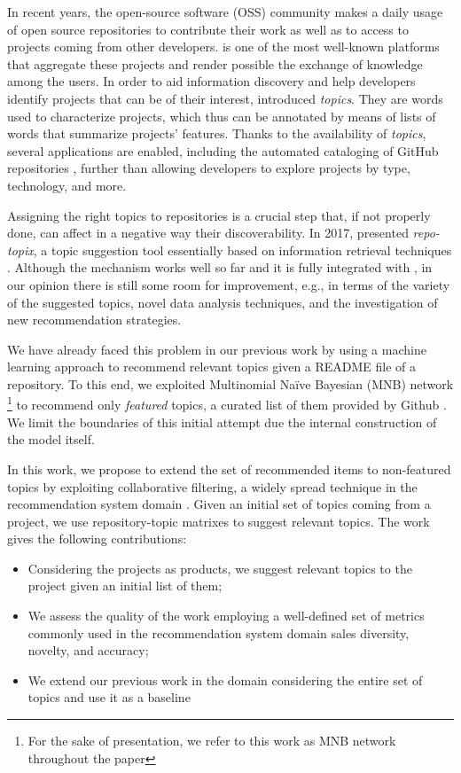 In recent years, the open-source software (OSS) community
makes a daily usage of open source repositories to
contribute their work as well as to access to projects
coming from other developers. \GH is one of the most
well-known platforms that aggregate these projects and
render possible the exchange of knowledge among the users.
%
In order to aid information discovery and help
developers identify projects that can be of their interest, \GH introduced \emph{topics}. They are
words used to characterize projects, which thus can be
annotated by means of lists of words that summarize projects' features. Thanks
to the availability of \emph{topics}, several applications are enabled,
including the automated cataloging of GitHub repositories \cite{davidlo1},
further than allowing developers to explore projects by type, technology, and
more.

Assigning the right topics to \GH repositories is a crucial step that, if not
properly done, can affect in a negative way their discoverability. In
2017, \GH presented \textit{repo-topix}, a topic suggestion tool essentially
based on information retrieval techniques \cite{noauthor_topic_nodate}.
Although the mechanism works well so far and it is fully integrated with \GH, in our opinion there is still some room for improvement, e.g., in terms of the variety
of the suggested topics, novel data analysis techniques, and the investigation of new recommendation strategies.

We have already faced this problem in our previous work \cite{MNB} by using a machine learning approach to recommend relevant topics given a README file of a repository. To this end, we exploited Multinomial Na\"ive Bayesian 
(MNB) network \footnote{For the sake of presentation, we refer to this work as MNB network throughout the paper} to recommend only \emph{featured} topics, a curated list of them provided by Github \cite{}. We limit the boundaries of this initial attempt due the internal construction of the model itself.

In this work, we propose to extend the set of recommended items to non-featured topics by exploiting collaborative filtering, a widely spread technique in the recommendation system domain \cite{Schafer:2007:CFR:1768197.1768208}. Given an initial set of topics coming from a \GH project, we use repository-topic matrixes to suggest relevant topics.
The work gives the following contributions:
\begin{itemize}
\item Considering the \GH projects as products, we suggest relevant topics to the project given an initial list of them;
\item We assess the quality of the work employing a well-defined set of metrics commonly used in the recommendation system domain \ie sales diversity, novelty, and accuracy;
\item We extend our previous work in the domain considering the entire set of topics and use it as a baseline
\end{itemize}

